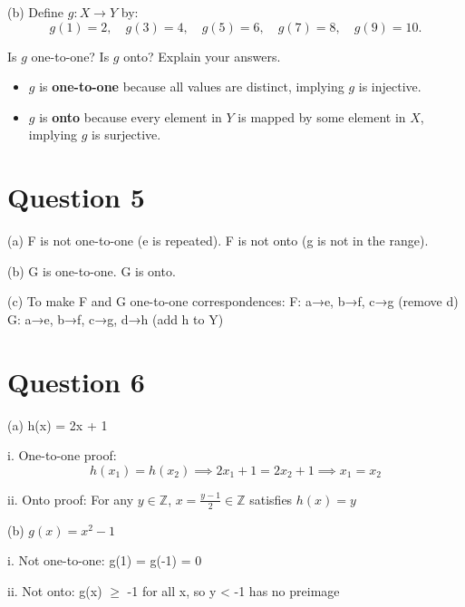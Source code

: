 \documentclass{article}
\begin{document}
(b) Define \( g : X \to Y \) by:
\[
g(1) = 2, \quad
g(3) = 4, \quad
g(5) = 6, \quad
g(7) = 8, \quad
g(9) = 10.
\]

Is \( g \) one-to-one? Is \( g \) onto? Explain your answers.

\begin{itemize}
    \item \( g \) is \textbf{one-to-one} because all values are distinct, implying \( g \) is injective.
    \item \( g \) is \textbf{onto} because every element in \( Y \) is mapped by some element in \( X \), implying \( g \) is surjective.
\end{itemize}

\section{Question 5}
(a) F is not one-to-one (e is repeated). F is not onto (g is not in the range).

(b) G is one-to-one. G is onto.

(c) To make F and G one-to-one correspondences:
F: a→e, b→f, c→g (remove d)
G: a→e, b→f, c→g, d→h (add h to Y)

\section{Question 6}
(a) h(x) = 2x + 1

i. One-to-one proof:
\[h(x_1) = h(x_2) \implies 2x_1 + 1 = 2x_2 + 1 \implies x_1 = x_2\]

ii. Onto proof:
For any $y \in \mathbb{Z}$, $x = \frac{y-1}{2} \in \mathbb{Z}$ satisfies $h(x) = y$

(b) $g(x) = x^2 - 1$

i. Not one-to-one: g(1) = g(-1) = 0

ii. Not onto: g(x) $\geq$ -1 for all x, so y < -1 has no preimage
\end{document}
